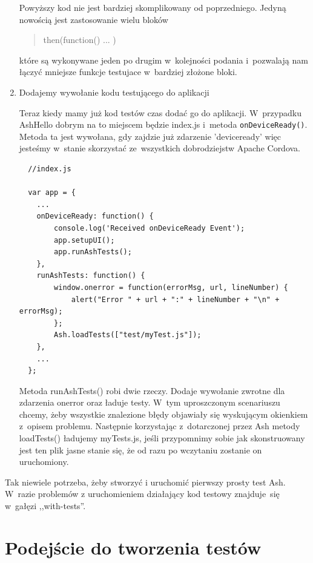 \documentclass[brudnopis]{xmgr}
\begin{document}
\begin{enumerate}
Powyższy kod nie jest bardziej skomplikowany od poprzedniego. Jedyną nowością jest zastosowanie wielu bloków 

\begin{quote}
then(function(){ ... })
\end{quote}

które są wykonywane jeden po drugim w~kolejności podania i~pozwalają nam łączyć mniejsze funkcje testujace w~bardziej złożone bloki.

 \item Dodajemy wywołanie kodu testującego do aplikacji

Teraz kiedy mamy już kod testów czas dodać go do aplikacji. W~przypadku AshHello dobrym na to miejscem będzie index.js i~metoda \mbox{\texttt{onDeviceReady()}}. Metoda ta jest wywołana, gdy zajdzie już zdarzenie 'deviceready' więc jesteśmy w~stanie skorzystać ze~wszystkich dobrodziejstw Apache Cordova.

 \begin{lstlisting}
  //index.js
  
  var app = {
	...
    onDeviceReady: function() {
        console.log('Received onDeviceReady Event');
        app.setupUI();
        app.runAshTests();
    },
    runAshTests: function() {
        window.onerror = function(errorMsg, url, lineNumber) {
            alert("Error " + url + ":" + lineNumber + "\n" + errorMsg);
        };
        Ash.loadTests(["test/myTest.js"]);
    },
	...
  };

\end{lstlisting}

Metoda runAshTests() robi dwie rzeczy. Dodaje wywołanie zwrotne dla zdarzenia onerror oraz ładuje testy. W~tym uproszczonym scenariuszu chcemy, żeby wszystkie znalezione błędy objawiały się wyskującym okienkiem z~opisem problemu. Następnie korzystając z~dotarczonej przez Ash metody loadTests() ładujemy myTests.js, jeśli przypomnimy sobie jak skonstruowany jest ten plik jasne stanie się, że od razu po wczytaniu zostanie on uruchomiony. 

\end{enumerate}

Tak niewiele potrzeba, żeby stworzyć i uruchomić pierwszy prosty test Ash. W~razie problemów z uruchomieniem działający kod testowy znajduje~się w~gałęzi ,,with-tests''.

\section{Podejście do tworzenia testów}
\end{document}
